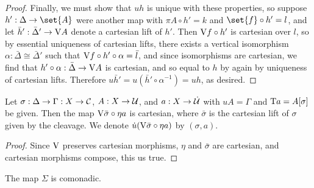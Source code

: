 \documentclass[../thesis.tex]{subfiles}
\begin{document}
\begin{proof}
  Finally, we must show that $uh$ is unique with these properties, so suppose $h' : \Delta \to \set{A}$ were
  another map with $\pi A \circ h' = k$ and $\set{f} \circ h' = l$, and let $\bar h' : \bar\Delta' \to {{\mathrm{V}}} A$
  denote a cartesian lift of $h'$. Then ${{\mathrm{V}}} f \circ h'$ is cartesian over $l$, so by essential uniqueness of
  cartesian lifts, there exists a vertical isomorphism $\alpha : \bar\Delta \cong \bar\Delta'$ such that ${{\mathrm{V}}}
  f \circ h' \circ \alpha = \bar l$, and since isomorphisms are cartesian, we find that $h' \circ \alpha : \bar
  \Delta \to {{\mathrm{V}}} A$ is cartesian, and so equal to $h$ by again by uniqueness of cartesian lifts. Therefore $u
  \bar h' = u (\bar h' \circ \alpha^{-1}) = uh$, as desired.
\end{proof}

\begin{proposition}
  Let $\sigma : \Delta \to \Gamma : X \to {\mathcal{C}}$, $A : X \to {\mathcal{U}}$, and $a : X \to \dot{{\mathcal{U}}}$ with $uA = \Gamma$
  and ${{\mathrm{T}}} a = A[\sigma]$ be given. Then the map ${{\mathrm{V}}}\bar\sigma \circ \eta a$ is cartesian, where $\bar
  \sigma$ is the cartesian lift of $\sigma$ given by the cleavage. We denote $\dot u({{\mathrm{V}}}\bar\sigma \circ
  \eta a)$ by $(\sigma,a)$.
\end{proposition}
\begin{proof}
  Since ${{\mathrm{V}}}$ preserves cartesian morphisms, $\eta$ and $\bar\sigma$ are cartesian, and cartesian morphisms
  compose, this us true.
\end{proof}


\begin{proposition}
  The map $\Sigma$ is comonadic.
\end{proposition}
\end{document}
